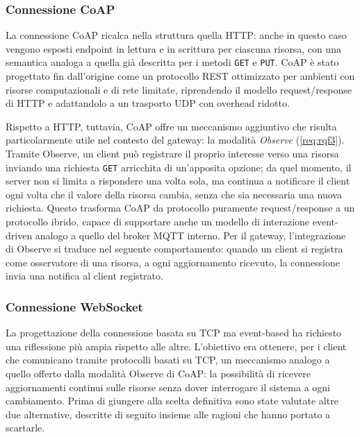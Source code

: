 \subsubsection{Connessione \ac{CoAP}}
\label{subsubsec:connessione-coap}
%
La connessione \ac{CoAP} ricalca nella struttura quella \ac{HTTP}: anche in questo caso vengono esposti endpoint in lettura e in scrittura per ciascuna risorsa, con una semantica analoga a quella già descritta per i metodi \texttt{GET} e \texttt{PUT}. \ac{CoAP} è stato progettato fin dall'origine come un protocollo \ac{REST} ottimizzato per ambienti con risorse computazionali e di rete limitate, riprendendo il modello request/response di \ac{HTTP} e adattandolo a un trasporto \ac{UDP} con overhead ridotto.

Rispetto a \ac{HTTP}, tuttavia, \ac{CoAP} offre un meccanismo aggiuntivo che risulta particolarmente utile nel contesto del gateway: la modalità \textit{Observe} (\ref{req:rqf3}). Tramite Observe, un client può registrare il proprio interesse verso una risorsa inviando una richiesta \texttt{GET} arricchita di un'apposita opzione; da quel momento, il server non si limita a rispondere una volta sola, ma continua a notificare il client ogni volta che il valore della risorsa cambia, senza che sia necessaria una nuova richiesta. Questo trasforma \ac{CoAP} da protocollo puramente request/response a un protocollo ibrido, capace di supportare anche un modello di interazione event-driven analogo a quello del broker \ac{MQTT} interno. Per il gateway, l'integrazione di Observe si traduce nel seguente comportamento: quando un client si registra come osservatore di una risorsa, a ogni aggiornamento ricevuto, la connessione invia una notifica al client registrato.
%
\subsubsection{Connessione WebSocket}
\label{subsubsec:connessione-websocket}
%
La progettazione della connessione basata su TCP ma event-based ha richiesto una riflessione più ampia rispetto alle altre. L'obiettivo era ottenere, per i client che comunicano tramite protocolli basati su \ac{TCP}, un meccanismo analogo a quello offerto dalla modalità Observe di \ac{CoAP}: la possibilità di ricevere aggiornamenti continui sulle risorse senza dover interrogare il sistema a ogni cambiamento. Prima di giungere alla scelta definitiva sono state valutate altre due alternative, descritte di seguito insieme alle ragioni che hanno portato a scartarle.

